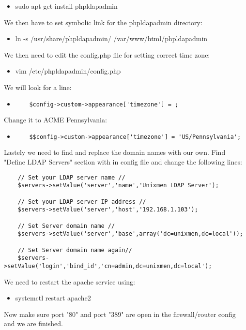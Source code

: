 \begin{itemize}
	\item sudo apt-get install phpldapadmin
\end{itemize}

\noindent We then have to set symbolic link for the phpldapadmin directory:

\begin{itemize}
	\item ln -s /usr/share/phpldapadmin/ /var/www/html/phpldapadmin
\end{itemize}

\noindent We then need to edit the config.php file for setting correct time 
zone:

\begin{itemize}
	\item vim /etc/phpldapadmin/config.php
\end{itemize}

\noindent We will look for a line: 
\begin{itemize}
	\item \begin{verbatim}
	$config->custom->appearance['timezone'] = ;
	\end{verbatim} 
\end{itemize} 

\noindent Change it to ACME Pennsylvania: 
\begin{itemize}
	\item \begin{verbatim}
	$$config->custom->appearance['timezone'] = 'US/Pennsylvania';
	\end{verbatim}
\end{itemize}

\noindent Lastely we need to find and replace the domain names with our own. 
Find "Define LDAP Servers" section with in config file and 
change the following lines:
\begin{verbatim}
	// Set your LDAP server name //
	$servers->setValue('server','name','Unixmen LDAP Server');
	
	// Set your LDAP server IP address // 
	$servers->setValue('server','host','192.168.1.103');
	
	// Set Server domain name //
	$servers->setValue('server','base',array('dc=unixmen,dc=local'));
	
	// Set Server domain name again//
	$servers->setValue('login','bind_id','cn=admin,dc=unixmen,dc=local');
\end{verbatim}

\noindent We need to restart the apache service using:
\begin{itemize}
	\item systemctl restart apache2
\end{itemize}

\noindent Now make sure port "80" and port "389" are open in the 
firewall/router config and we are finished.

